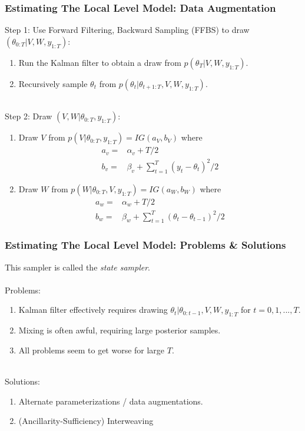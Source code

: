 \documentclass[xcolor=dvipsnames]{beamer}\usepackage{graphicx, color}
\begin{document}
\begin{frame}
  \frametitle{Estimating The Local Level Model: Data Augmentation}
Step 1: Use Forward Filtering, Backward Sampling (FFBS) to draw $(\theta_{0:T}|V,W,y_{1:T})$:
\begin{enumerate}
  \item Run the Kalman filter to obtain a draw from $p(\theta_T|V, W, y_{1:T})$.
  \item Recursively sample $\theta_t$ from $p(\theta_t|\theta_{t+1:T}, V, W, y_{1:T})$.\\~\\
\end{enumerate}
\pause
Step 2: Draw $(V,W|\theta_{0:T},y_{1:T})$:
\begin{enumerate}
  \item Draw $V$ from $p(V|\theta_{0:T}, y_{1:T})=IG(a_V, b_V)$ where
    \begin{align*}
      a_v =& \alpha_v + T/2\\
      b_v = & \beta_v + \textstyle\sum_{t=1}^T(y_t-\theta_t)^2/2
    \end{align*}
  \item Draw $W$ from $p(W|\theta_{0:T}, V, y_{1:T})=IG(a_W, b_W)$ where
    \begin{align*}
      a_w =& \alpha_w + T/2\\
      b_w = & \beta_w + \textstyle\sum_{t=1}^T(\theta_t-\theta_{t-1})^2/2
    \end{align*}
\end{enumerate}

\end{frame}

\begin{frame}
  \frametitle{Estimating The Local Level Model: Problems \& Solutions}
  This sampler is called the {\it \color{red} state sampler}.\\~\\
Problems:
\begin{enumerate}
  \item Kalman filter effectively requires drawing $\theta_t|\theta_{0:t-1},V,W,y_{1:T}$ for $t=0,1,...,T$. 
  \item Mixing is often awful, requiring large posterior samples. 
  \item All problems seem to get worse for large $T$.\\~\\
\end{enumerate}
\pause

Solutions:
\begin{enumerate}
  \item Alternate parameterizations / data augmentations. 
  \item (Ancillarity-Sufficiency) Interweaving
\end{enumerate}
\end{frame}
\end{document}

